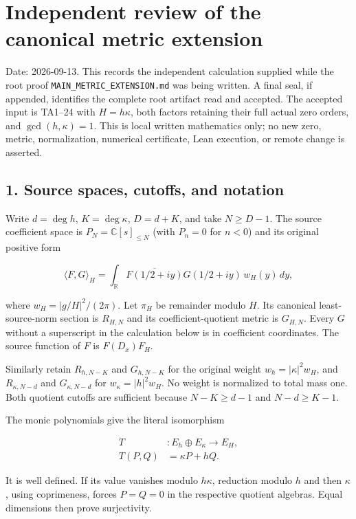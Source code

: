 \section*{Independent review of the canonical metric extension}

Date: 2026-09-13. This records the independent calculation supplied while
the root proof \texttt{MAIN\_METRIC\_EXTENSION.md} was being written. A final seal,
if appended, identifies the complete root artifact read and accepted.
The accepted input is TA1--24 with \(H=h\kappa\), both factors retaining their
full actual zero orders, and \(\gcd(h,\kappa)=1\). This is local written
mathematics only; no new zero, metric, normalization, numerical certificate,
Lean execution, or remote change is asserted.

\subsection*{1. Source spaces, cutoffs, and notation}

Write \(d=\deg h\), \(K=\deg\kappa\), \(D=d+K\), and take \(N\ge D-1\). The source coefficient
space is \(P_N=\mathbb{C}[s]_{\le N}\) (with \(P_n=0\) for \(n<0\)) and its original positive form

\[\langle F,G\rangle_H=\int_{\mathbb{R}}\overline{F(1/2+iy)}G(1/2+iy)\,w_H(y)\,dy,\]

where \(w_H=|g/H|^2/(2\pi)\). Let \(\pi_H\) be remainder modulo \(H\). Its canonical
least-source-norm section is \(R_{H,N}\) and its coefficient-quotient metric is
\(G_{H,N}\). Every \(G\) without a superscript in the calculation below is in
coefficient coordinates. The source function of \(F\) is \(F(D_x)F_H\).

Similarly retain \(R_{h,N-K}\) and \(G_{h,N-K}\) for the original weight
\(w_h=|\kappa|^2w_H\), and \(R_{\kappa,N-d}\) and \(G_{\kappa,N-d}\) for
\(w_\kappa=|h|^2w_H\). No weight is normalized to total mass one. Both
quotient cutoffs are sufficient because \(N-K\ge d-1\) and \(N-d\ge K-1\).

The monic polynomials give the literal isomorphism

\[\begin{aligned}T&:E_h\oplus E_\kappa\longrightarrow E_H,\\
T(P,Q)&=\kappa P+hQ.\end{aligned}\]

It is well defined. If its value vanishes modulo \(h\kappa\), reduction
modulo \(h\) and then \(\kappa\), using coprimeness, forces \(P=Q=0\) in the
respective quotient algebras. Equal dimensions then prove surjectivity.

